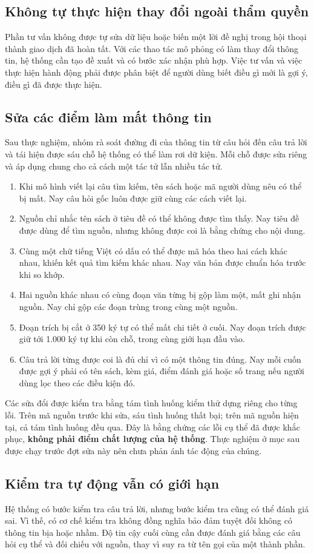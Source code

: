 \subsection{Không tự thực hiện thay đổi ngoài thẩm quyền}
Phần tư vấn không được tự sửa dữ liệu hoặc biến một lời đề nghị trong hội thoại thành giao dịch đã hoàn tất. Với các thao tác mô phỏng có làm thay đổi thông tin, hệ thống cần tạo đề xuất và có bước xác nhận phù hợp. Việc tư vấn và việc thực hiện hành động phải được phân biệt để người dùng biết điều gì mới là gợi ý, điều gì đã được thực hiện.

\subsection{Sửa các điểm làm mất thông tin}
Sau thực nghiệm, nhóm rà soát đường đi của thông tin từ câu hỏi đến câu trả lời và tái hiện được sáu chỗ hệ thống có thể làm rơi dữ kiện. Mỗi chỗ được sửa riêng và áp dụng chung cho cả cách một tác tử lẫn nhiều tác tử. 
\begin{enumerate}
\item Khi mô hình viết lại câu tìm kiếm, tên sách hoặc mã người dùng nêu có thể bị mất. Nay câu hỏi gốc luôn được giữ cùng các cách viết lại.
\item Nguồn chỉ nhắc tên sách ở tiêu đề có thể không được tìm thấy. Nay tiêu đề được dùng để tìm nguồn, nhưng không được coi là bằng chứng cho nội dung.
\item Cùng một chữ tiếng Việt có dấu có thể được mã hóa theo hai cách khác nhau, khiến kết quả tìm kiếm khác nhau. Nay văn bản được chuẩn hóa trước khi so khớp.
\item Hai nguồn khác nhau có cùng đoạn văn từng bị gộp làm một, mất ghi nhận nguồn. Nay chỉ gộp các đoạn trùng trong cùng một nguồn.
\item Đoạn trích bị cắt ở 350 ký tự có thể mất chi tiết ở cuối. Nay đoạn trích được giữ tới 1.000 ký tự khi còn chỗ, trong cùng giới hạn đầu vào.
\item Câu trả lời từng được coi là đủ chỉ vì có một thông tin đúng. Nay mỗi cuốn được gợi ý phải có tên sách, kèm giá, điểm đánh giá hoặc số trang nếu người dùng lọc theo các điều kiện đó.
\end{enumerate}
Các sửa đổi được kiểm tra bằng tám tình huống kiểm thử dựng riêng cho từng lỗi. Trên mã nguồn trước khi sửa, sáu tình huống thất bại; trên mã nguồn hiện tại, cả tám tình huống đều qua. Đây là bằng chứng các lỗi cụ thể đã được khắc phục, \textbf{không phải điểm chất lượng của hệ thống}. Thực nghiệm ở mục sau được chạy trước đợt sửa này nên chưa phản ánh tác động của chúng.

\subsection{Kiểm tra tự động vẫn có giới hạn}
Hệ thống có bước kiểm tra câu trả lời, nhưng bước kiểm tra cũng có thể đánh giá sai. Vì thế, có cơ chế kiểm tra không đồng nghĩa bảo đảm tuyệt đối không có thông tin bịa hoặc nhầm. Độ tin cậy cuối cùng cần được đánh giá bằng các câu hỏi cụ thể và đối chiếu với nguồn, thay vì suy ra từ tên gọi của một thành phần.
